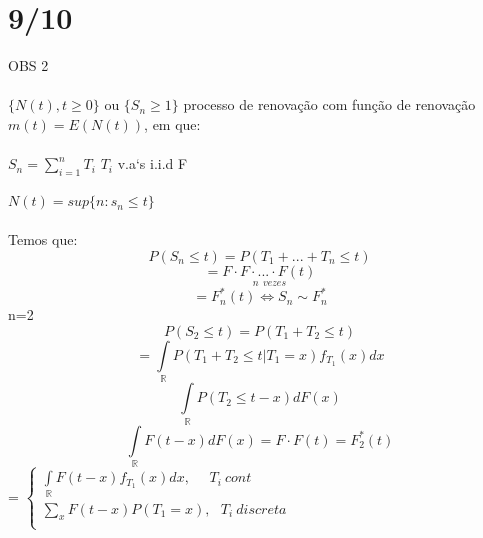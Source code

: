 \documentclass[a4paper,12pt]{article}
\begin{document}
      \section*{9/10}
      OBS 2 \\
      \\
      $\{N(t),t\ge0\}$ ou $\{S_n\ge1 \}$ processo de renovação com função de renovação $m(t)=E(N(t))$, em que:\\
      \\
      $S_n=\sum_{i=1}^{n}T_i$ $T_i$ v.a`s i.i.d F\\
      \\
     $ N(t)=sup\{n:s_n\le t\}$\\
     \\
     Temos que:\\
     $$P(S_n\le t )=P(T_1+...+T_n\le t)$$
     $$=\underset{n\ \ vezes}{F\cdot F\cdot...\cdot F(t)} $$
     $$=F^*_n(t)\iff S_n\sim F_n^* $$
     n=2
     $$P(S_2\le t)=P(T_1+T_2\le t) $$
     $$=\int\limits_{\mathbb{R}}P(T_1+T_2\le t|T_1=x)f_{T_1}(x)dx $$
     $$\int\limits_{\mathbb{R}}P(T_2\le t-x) dF(x)$$
          $$\int\limits_{\mathbb{R}}F(t-x) dF(x)=F\cdot F(t)=F_2^*(t)$$
          =
          $\begin{cases*}
         \int\limits_{\mathbb{R}}F(t-x)f_{T_1}(x)dx, \ \ \ \ \ \ T_i \ cont\\
         \sum\limits_xF(t-x)P(T_1=x), \ \ \ T_i \ discreta\\
          \end{cases*}
          $
          \newpage
\end{document}
